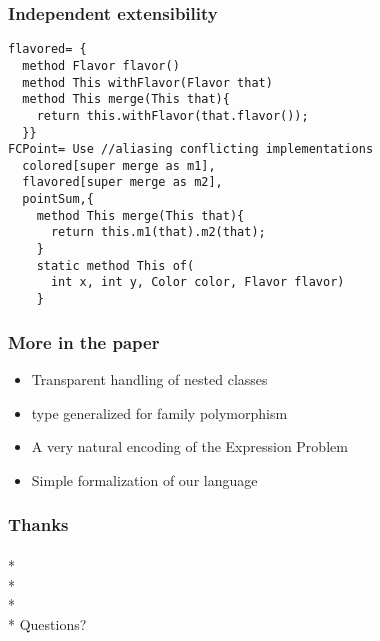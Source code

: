 \begin{frame}[fragile]
\frametitle{Independent extensibility}

 \begin{lstlisting}
flavored= {
  method Flavor flavor()
  method This withFlavor(Flavor that)
  method This merge(This that){
    return this.withFlavor(that.flavor());
  }}
FCPoint= Use //aliasing conflicting implementations
  colored[super merge as m1],
  flavored[super merge as m2],
  pointSum,{
    method This merge(This that){
      return this.m1(that).m2(that);
    }
    static method This of(
      int x, int y, Color color, Flavor flavor)
    }
\end{lstlisting} 
\end{frame}

\begin{frame}[fragile]
\frametitle{More in the paper}

\begin{itemize}
\item Transparent handling of nested classes
\item \Q@This@ type generalized for family polymorphism
\item A very natural encoding of the Expression Problem 
\item Simple formalization of our language
\end{itemize}

\end{frame}

\begin{frame}[fragile]
\frametitle{Thanks}
${}_{}$\\*
${}_{}$\\*
${}_{}$\\*
${}_{}$\\*
Questions?
\end{frame}


